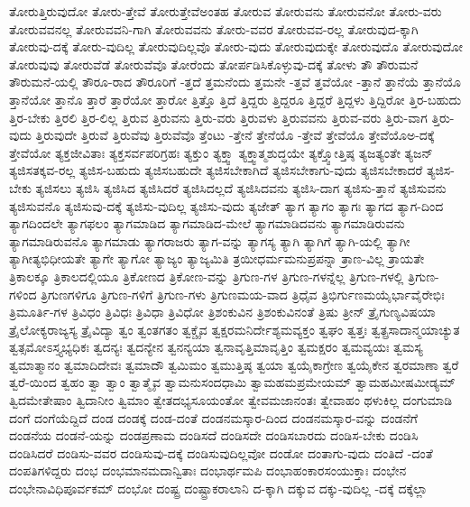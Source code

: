 {ತೋರುತ್ತಿರುವುದೋ
ತೋರು-ತ್ತೇವೆ
ತೋರುತ್ತೇವೆಅಂತಹ
ತೋರುವ
ತೋರುವನು
ತೋರುವನೋ
ತೋರು-ವರು
ತೋರುವವನಲ್ಲ
ತೋರುವವನಿ-ಗಾಗಿ
ತೋರುವವನು
ತೋರು-ವವರ
ತೋರುವವ-ರಲ್ಲ
ತೋರುವುದ-ಕ್ಕಾಗಿ
ತೋರುವು-ದಕ್ಕೆ
ತೋರು-ವುದಿಲ್ಲ
ತೋರುವುದಿಲ್ಲವೊ
ತೋರು-ವುದು
ತೋರುವುದುಕ್ಕೇ
ತೋರುವುದೊ
ತೋರುವುದೋ
ತೋರುವುವು
ತೋರುವೆಡೆ
ತೋರುವೆವೊ
ತೋರೆಂದು
ತೋರ್ಪಡಿಸಿಕೊಳ್ಳುವು-ದಕ್ಕೆ
ತೋಳು
ತೌ
ತೌರುಮನೆ
ತೌರುಮನೆ-ಯಲ್ಲಿ
ತೌರೂ-ರಾದ
ತೌರೂರಿಗೆ
-ತ್ತದೆ
ತ್ತಮನೆಂದು
ತ್ತಮನೇ
-ತ್ತವೆ
ತ್ತವೆಯೋ
-ತ್ತಾನೆ
ತ್ತಾನೆಯೆ
ತ್ತಾನೆಯೊ
ತ್ತಾನೆಯೋ
ತ್ತಾನೊ
ತ್ತಾರೆ
ತ್ತಾರೆಯೋ
ತ್ತಾರೋ
ತ್ತಿತ್ತೊ
ತ್ತಿದೆ
ತ್ತಿದ್ದರು
ತ್ತಿದ್ದರೂ
ತ್ತಿದ್ದರೆ
ತ್ತಿದ್ದಳು
ತ್ತಿದ್ದಿರೋ
ತ್ತಿರ-ಬಹುದು
ತ್ತಿರ-ಬೇಕು
ತ್ತಿರಲಿ
ತ್ತಿರ-ಲಿಲ್ಲ
ತ್ತಿರುವ
ತ್ತಿರುವನು
ತ್ತಿರು-ವರು
ತ್ತಿರುವಳು
ತ್ತಿರುವವನು
ತ್ತಿರುವ-ವರು
ತ್ತಿರು-ವಾಗ
ತ್ತಿರು-ವುದು
ತ್ತಿರುವುದೇ
ತ್ತಿರುವೆ
ತ್ತಿರುವೆವು
ತ್ತಿರುವೆವೊ
ತ್ತೆಂಟು
-ತ್ತೇನೆ
ತ್ತೇನೆಯೊ
-ತ್ತೇವೆ
ತ್ತೇವೆಯೊ
ತ್ತೇವೆಯೊಅ-ದಕ್ಕೆ
ತ್ತೇವೆಯೋ
ತ್ಯಕ್ತಜೀವಿತಾಃ
ತ್ಯಕ್ತಸರ್ವಪರಿಗ್ರಹಃ
ತ್ಯಕ್ತುಂ
ತ್ಯಕ್ತ್ವಾ
ತ್ಯಕ್ತ್ವಾತ್ಮಶುದ್ಧಯೇ
ತ್ಯಕ್ತ್ವೋತ್ತಿಷ್ಠ
ತ್ಯಜತ್ಯಂತೇ
ತ್ಯಜನ್
ತ್ಯಜಿಸತಕ್ಕವ-ರಲ್ಲ
ತ್ಯಜಿಸ-ಬಹುದು
ತ್ಯಜಿಸಬಹುದೇ
ತ್ಯಜಿಸಬೇಕಾಗಿದೆ
ತ್ಯಜಿಸಬೇಕಾಗು-ವುದು
ತ್ಯಜಿಸಬೇಕಾದರೆ
ತ್ಯಜಿಸ-ಬೇಕು
ತ್ಯಜಿಸಲು
ತ್ಯಜಿಸಿ
ತ್ಯಜಿಸಿದ
ತ್ಯಜಿಸಿದರೆ
ತ್ಯಜಿಸಿದಲ್ಲದೆ
ತ್ಯಜಿಸಿದವನು
ತ್ಯಜಿಸಿ-ದಾಗ
ತ್ಯಜಿಸು-ತ್ತಾನೆ
ತ್ಯಜಿಸುವನು
ತ್ಯಜಿಸುವನೊ
ತ್ಯಜಿಸುವು-ದಕ್ಕೆ
ತ್ಯಜಿಸು-ವುದಿಲ್ಲ
ತ್ಯಜಿಸು-ವುದು
ತ್ಯಜೇತ್
ತ್ಯಾಗ
ತ್ಯಾಗಂ
ತ್ಯಾಗಃ
ತ್ಯಾಗದ
ತ್ಯಾಗ-ದಿಂದ
ತ್ಯಾಗದಿಂದಲೇ
ತ್ಯಾಗಫಲಂ
ತ್ಯಾಗಮಾಡಿದ
ತ್ಯಾಗಮಾಡಿದ-ಮೇಲೆ
ತ್ಯಾಗಮಾಡಿದವನು
ತ್ಯಾಗಮಾಡಿರುವನು
ತ್ಯಾಗಮಾಡಿರುವನೊ
ತ್ಯಾಗಮಾಡು
ತ್ಯಾಗರಾಜರು
ತ್ಯಾಗ-ವನ್ನು
ತ್ಯಾಗಸ್ಯ
ತ್ಯಾಗಿ
ತ್ಯಾಗಿಗೆ
ತ್ಯಾಗಿ-ಯಲ್ಲಿ
ತ್ಯಾಗೀ
ತ್ಯಾಗೀತ್ಯಭಿಧೀಯತೇ
ತ್ಯಾಗೇ
ತ್ಯಾಗೋ
ತ್ಯಾಜ್ಯಂ
ತ್ಯಾಜ್ಯಮಿತಿ
ತ್ರಯೀಧರ್ಮಮನುಪ್ರಪನ್ನಾ
ತ್ರಾಣ-ವಿಲ್ಲ
ತ್ರಾಯತೇ
ತ್ರಿಕಾಲಕ್ಕೂ
ತ್ರಿಕಾಲದಲ್ಲಿಯೂ
ತ್ರಿಕೋಣದ
ತ್ರಿಕೋಣ-ವನ್ನು
ತ್ರಿಗುಣ-ಗಳ
ತ್ರಿಗುಣ-ಗಳನ್ನೆಲ್ಲ
ತ್ರಿಗುಣ-ಗಳಲ್ಲಿ
ತ್ರಿಗುಣ-ಗಳಿಂದ
ತ್ರಿಗುಣಗಳಿಗೂ
ತ್ರಿಗುಣ-ಗಳಿಗೆ
ತ್ರಿಗುಣ-ಗಳು
ತ್ರಿಗುಣಮಯ-ವಾದ
ತ್ರಿಧೈವ
ತ್ರಿಭಿರ್ಗುಣಮಯೈರ್ಭಾವೈರೇಭಿಃ
ತ್ರಿಮೂರ್ತಿ-ಗಳ
ತ್ರಿವಿಧಂ
ತ್ರಿವಿಧಃ
ತ್ರಿವಿಧಾ
ತ್ರಿವಿಧೋ
ತ್ರಿಶಂಕುವಿನ
ತ್ರಿಶಂಕುವಿನಂತೆ
ತ್ರಿಷು
ತ್ರೀನ್
ತ್ರೈಗುಣ್ಯವಿಷಯಾ
ತ್ರೈಲೋಕ್ಯರಾಜ್ಯಸ್ಯ
ತ್ರೈವಿದ್ಯಾ
ತ್ವಂ
ತ್ವಂತಗತಂ
ತ್ವಕ್ಚೈವ
ತ್ವಕ್ಷರಮನಿರ್ದೇಶ್ಯಮವ್ಯಕ್ತಂ
ತ್ವಘಂ
ತ್ವತ್ತಃ
ತ್ವತ್ಪ್ರಸಾದಾನ್ಮಯಾಚ್ಯುತ
ತ್ವತ್ಸಮೋಽಸ್ತ್ಯಭ್ಯಧಿಕಃ
ತ್ವದನ್ಯಃ
ತ್ವದನ್ಯೇನ
ತ್ವನನ್ಯಯಾ
ತ್ವನಾವೃತ್ತಿಮಾವೃತ್ತಿಂ
ತ್ವಮಕ್ಷರಂ
ತ್ವಮವ್ಯಯಃ
ತ್ವಮಸ್ಯ
ತ್ವಮಾತ್ಮಾನಂ
ತ್ವಮಾದಿದೇವಃ
ತ್ವಮಾದೌ
ತ್ವಮಿಮಂ
ತ್ವಮುತ್ತಿಷ್ಠ
ತ್ವಯಾ
ತ್ವಯೈಕಾಗ್ರೇಣ
ತ್ವಯೈಕೇನ
ತ್ವರಮಾಣಾ
ತ್ವರೆ
ತ್ವರೆ-ಯಿಂದ
ತ್ವಹಂ
ತ್ವಾ
ತ್ವಾಂ
ತ್ವಾತ್ಮೈವ
ತ್ವಾಮನುಸಂದಧಾಮಿ
ತ್ವಾಮಹಮಪ್ರಮೇಯಮ್
ತ್ವಾಮಹಮೀಷಮೀಡ್ಯಮ್
ತ್ವಿದಮೇತೇಷಾಂ
ತ್ವಿದಾನೀಂ
ತ್ವಿಮಾಂ
ತ್ವೇತದಭ್ಯಸೂಯಂತೋ
ತ್ವೇವಮಜಾನಂತಃ
ತ್ವೇವಾಹಂ
ಥಳುಕಿಲ್ಲ
ದಂಗುಮಾಡಿ
ದಂಗೆ
ದಂಗೆಯೆದ್ದಿದೆ
ದಂಡ
ದಂಡಕ್ಕೆ
ದಂಡ-ದಂತೆ
ದಂಡನಮಸ್ಕಾರ-ದಿಂದ
ದಂಡನಮಸ್ಕಾರ-ವನ್ನು
ದಂಡನೆಗೆ
ದಂಡನೆಯ
ದಂಡನೆ-ಯನ್ನು
ದಂಡಪ್ರಣಾಮ
ದಂಡಿಸದೆ
ದಂಡಿಸದೇ
ದಂಡಿಸಬಾರದು
ದಂಡಿಸ-ಬೇಕು
ದಂಡಿಸಿ
ದಂಡಿಸಿದರೆ
ದಂಡಿಸು-ವವರ
ದಂಡಿಸುವು-ದಕ್ಕೆ
ದಂಡಿಸುವುದಿಲ್ಲವೋ
ದಂಡೋ
ದಂತಾಗು-ವುದು
ದಂತಿದೆ
-ದಂತೆ
ದಂಪತಿಗಳಿದ್ದರು
ದಂಭ
ದಂಭಮಾನಮದಾನ್ವಿತಾಃ
ದಂಭಾರ್ಥಮಪಿ
ದಂಭಾಹಂಕಾರಸಂಯುಕ್ತಾಃ
ದಂಭೇನ
ದಂಭೇನಾವಿಧಿಪೂರ್ವಕಮ್
ದಂಭೋ
ದಂಷ್ಟ್ರ
ದಂಷ್ಟ್ರಾಕರಾಲಾನಿ
ದ-ಕ್ಕಾಗಿ
ದಕ್ಕುವ
ದಕ್ಕು-ವುದಿಲ್ಲ
-ದಕ್ಕೆ
ದಕ್ಕೆಲ್ಲಾ
}
